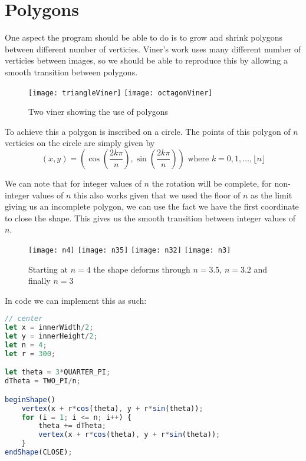 \section{Polygons}
\label{Polygons}
One aspect the program should be able to do is to grow and shrink polygons
between different number of verticies. Viner's work uses many different number
of verticies between images, so we should be able to reproduce this by allowing
a smooth transition between polygons. 

\begin{figure}[H]
    \centering
    \texttt{[image: triangleViner]}
    \hspace{0.2cm}
    \texttt{[image: octagonViner]}
    \caption{Two viner showing the use of polygons}
\end{figure}


To achieve this a polygon is inscribed on a circle. The points of this polygon
of $n$ verticies on the circle are simply given by $$(x, y) = (\cos(\frac{2k
\pi}{n}), \sin(\frac{2k\pi}{n})) \text{ where } k = 0, 1, \ldots, \lfloor n
\rfloor$$ 

We can note that for integer values of $n$ the rotation will be complete, for
non-integer values of $n$ this also works given that we used the floor of $n$ as
the limit giving us an incomplete polygon, we can use the fact we have the first
coordinate to close the shape. This gives us the smooth transition between
integer values of $n$.

\begin{figure}[H]
    \centering
    \texttt{[image: n4]}
    \texttt{[image: n35]}
    \texttt{[image: n32]}
    \texttt{[image: n3]}
    \caption{Starting at $n=4$ the shape deforms through $n=3.5$, $n=3.2$ and
    finally $n=3$}
\end{figure}

In code we can implement this as such:
\begin{lstlisting}[language=JavaScript]
// center
let x = innerWidth/2;
let y = innerHeight/2;
let n = 4;
let r = 300;

let theta = 3*QUARTER_PI;
dTheta = TWO_PI/n;

beginShape()
    vertex(x + r*cos(theta), y + r*sin(theta));
    for (i = 1; i <= n; i++) {
        theta += dTheta;
        vertex(x + r*cos(theta), y + r*sin(theta));
    }
endShape(CLOSE);
\end{lstlisting}

